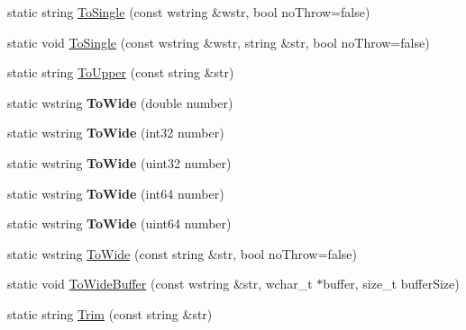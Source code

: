 \begin{DoxyCompactItemize}
\item 
static string \hyperlink{class_gost_crypt_1_1_string_converter_a95c318badff98d1c3902e5b375b4fd43}{To\+Single} (const wstring \&wstr, bool no\+Throw=false)
\item 
static void \hyperlink{class_gost_crypt_1_1_string_converter_a8ef47849206bb6b17d9d8c7ca030a0a7}{To\+Single} (const wstring \&wstr, string \&str, bool no\+Throw=false)
\item 
static string \hyperlink{class_gost_crypt_1_1_string_converter_a52abce3a067b2fb0dfedcc7cc31206fc}{To\+Upper} (const string \&str)
\item 
\mbox{\label{class_gost_crypt_1_1_string_converter_a8f8279c9e7fee373032ea682343a3438}} 
static wstring {\bfseries To\+Wide} (double number)
\item 
\mbox{\label{class_gost_crypt_1_1_string_converter_ab84dfd534ef66dc144234f86453bcd89}} 
static wstring {\bfseries To\+Wide} (int32 number)
\item 
\mbox{\label{class_gost_crypt_1_1_string_converter_a9f4eaee5c6c2d4c210070a12bc70ee77}} 
static wstring {\bfseries To\+Wide} (uint32 number)
\item 
\mbox{\label{class_gost_crypt_1_1_string_converter_a347bdf303b54836b818c654d4ede9b3f}} 
static wstring {\bfseries To\+Wide} (int64 number)
\item 
\mbox{\label{class_gost_crypt_1_1_string_converter_a9c82be7ff94a89c83cae39bb16e1c514}} 
static wstring {\bfseries To\+Wide} (uint64 number)
\item 
static wstring \hyperlink{class_gost_crypt_1_1_string_converter_a3dd380a8d6cd73590b632520ecbf13e1}{To\+Wide} (const string \&str, bool no\+Throw=false)
\item 
static void \hyperlink{class_gost_crypt_1_1_string_converter_aaef742101c5ac209f8af526c35ee415a}{To\+Wide\+Buffer} (const wstring \&str, wchar\+\_\+t $\ast$buffer, size\+\_\+t buffer\+Size)
\item 
static string \hyperlink{class_gost_crypt_1_1_string_converter_aab7bde96fdac70b8e673950f15ef8197}{Trim} (const string \&str)
\end{DoxyCompactItemize}


